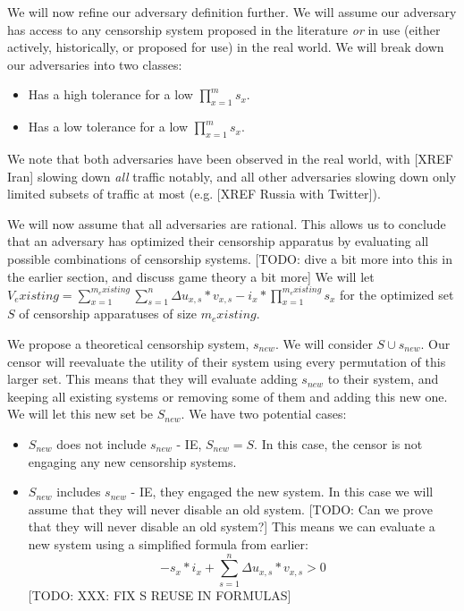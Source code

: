 \documentclass[12pt]{report}
\begin{document}
We will now refine our adversary definition further. We will assume our adversary has access to any censorship system proposed in the literature \emph{or} in use (either actively, historically, or proposed for use) in the real world. We will break down our adversaries into two classes:
\begin{itemize}
  \item Has a high tolerance for a low $\prod_{x=1}^{m}s_x$.
  \item Has a low tolerance for a low $\prod_{x=1}^{m}s_x$.
\end{itemize}
We note that both adversaries have been observed in the real world, with [XREF Iran] slowing down \emph{all} traffic notably, and all other adversaries slowing down only limited subsets of traffic at most (e.g. [XREF Russia with Twitter]).

We will now assume that all adversaries are rational. This allows us to conclude that an adversary has optimized their censorship apparatus by evaluating all possible combinations of censorship systems. [TODO: dive a bit more into this in the earlier section, and discuss game theory a bit more] We will let $V_existing = \sum_{x=1}^{m_existing}\sum_{s=1}^{n}\Delta u_{x,s}*v_{x,s} - i_{x} * \prod_{x=1}^{m_existing}s_x$ for the optimized set $S$ of censorship apparatuses of size $m_existing$.

We propose a theoretical censorship system, $s_{new}$. We will consider $S \cup {s_{new}}$. Our censor will reevaluate the utility of their system using every permutation of this larger set. This means that they will evaluate adding $s_{new}$ to their system, and keeping all existing systems or removing some of them and adding this new one. We will let this new set be $S_{new}$. We have two potential cases:
\begin{itemize}
  \item $S_{new}$ does not include $s_{new}$ - IE, $S_{new} = S$. In this case, the censor is not engaging any new censorship systems.
  \item $S_{new}$ includes $s_{new}$ - IE, they engaged the new system. In this case we will assume that they will never disable an old system. [TODO: Can we prove that they will never disable an old system?] This means we can evaluate a new system using a simplified formula from earlier:
  \begin{equation}
-s_x*i_x + \sum_{s=1}^{n}\Delta u_{x,s}*v_{x,s} > 0
  \end{equation}
  [TODO: XXX: FIX S REUSE IN FORMULAS]
\end{itemize}
\end{document}
